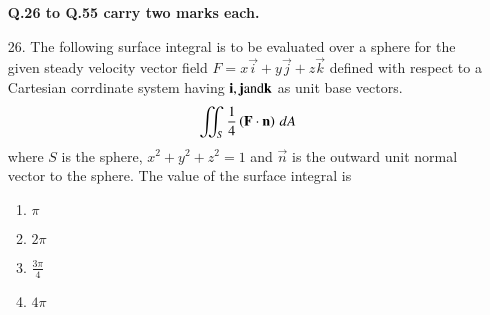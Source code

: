 \documentclass[journal,12pt,onecolumn]{IEEEtran}
\theoremstyle{remark}
\begin{document}
\begin{enumerate}
\begin{enumerate}
\begin{multicols}{2}
                \end{multicols}
        \end{enumerate}
        \textbf{Q.26 to Q.55 carry two marks each.}\\
    \item[26.] The following surface integral is to be evaluated over a sphere for the 
        given steady velocity vector field $F = x\vec{i} + y\vec{j} + z\vec{k}$ defined
        with respect to a Cartesian corrdinate system having $\vec{i}, \vec{j} \textnormal{and} \vec{k}$
        as unit base vectors.
        \begin{align}
            \iint_S \frac{1}{4} \brak{\vec{F} \cdot \vec{n}} \, dA 
        \end{align}
        where $S$ is the sphere, $x^2 + y^2 + z^2 = 1$ and $\vec{n}$ is the outward
        unit normal vector to the sphere. The value of the surface integral is
        \hfill{}
        \begin{multicols}{4}
            \begin{enumerate}
                \item $\pi$ 
                    \columnbreak
                \item $2\pi$
                    \columnbreak
                \item $\frac{3\pi}{4}$
                    \columnbreak
                \item $4\pi$
            \end{enumerate}
        \end{multicols}
\end{enumerate}
\end{document}
